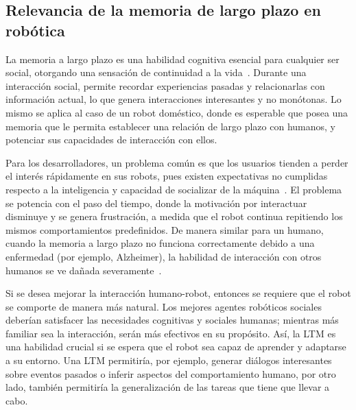 \subsection{Relevancia de la memoria de largo plazo en robótica}

La memoria a largo plazo es una habilidad cognitiva esencial para cualquier ser social, otorgando una sensación de continuidad a la vida~\cite{Vijayakumar2014}. Durante una interacción social, permite recordar experiencias pasadas y relacionarlas con información actual, lo que genera interacciones interesantes y no monótonas. Lo mismo se aplica al caso de un robot doméstico, donde es esperable que posea una memoria que le permita establecer una relación de largo plazo con humanos, y potenciar sus capacidades de interacción con ellos.

Para los desarrolladores, un problema común es que los usuarios tienden a perder el interés rápidamente en sus robots, pues existen expectativas no cumplidas respecto a la inteligencia y capacidad de socializar de la máquina~\cite{Ho2009}. El problema se potencia con el paso del tiempo, donde la motivación por interactuar disminuye y se genera frustración, a medida que el robot continua repitiendo los mismos comportamientos predefinidos. De manera similar para un humano, cuando la memoria a largo plazo no funciona correctamente debido a una enfermedad (por ejemplo, Alzheimer), la habilidad de interacción con otros humanos se ve dañada severamente~\cite{ltm_in_robocup}.

Si se desea mejorar la interacción humano-robot, entonces se requiere que el robot se comporte de manera más natural. Los mejores agentes robóticos sociales deberían satisfacer las necesidades cognitivas y sociales humanas; mientras más familiar sea la interacción, serán más efectivos en su propósito. Así, la LTM es una habilidad crucial si se espera que el robot sea capaz de aprender y adaptarse a su entorno. Una LTM permitiría, por ejemplo, generar diálogos interesantes sobre eventos pasados o inferir aspectos del comportamiento humano, por otro lado, también permitiría la generalización de las tareas que tiene que llevar a cabo.

